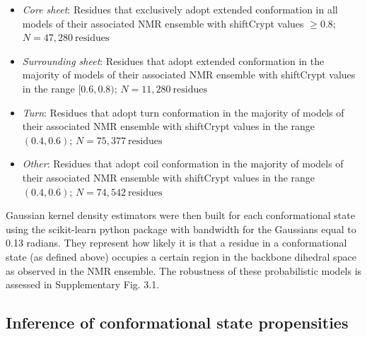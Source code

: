 \begin{itemize}
  \item \textit{Core sheet}: Residues that exclusively adopt extended conformation in all models of their associated NMR ensemble with shiftCrypt values $\ge 0.8$; $N = 47,280 \:\text{residues}$
  \item \textit{Surrounding sheet}: Residues that adopt extended conformation in the majority of models of their associated NMR ensemble with shiftCrypt values in the range $[0.6, 0.8)$; $N = 11,280 \:\text{residues}$
  \item \textit{Turn}: Residues that adopt turn conformation in the majority of models of their associated NMR ensemble with shiftCrypt values in the range $(0.4, 0.6)$; $N = 75,377 \:\text{residues}$
  \item \textit{Other}: Residues that  adopt coil conformation in the majority of models of their associated NMR ensemble with shiftCrypt values in the range $(0.4, 0.6)$; $N = 74,542 \:\text{residues}$
\end{itemize}

Gaussian kernel density estimators were then built for each conformational state using the scikit-learn python package with bandwidth for the Gaussians equal to 0.13 radians. They represent how likely it is that a residue in a conformational state (as defined above) occupies a certain region in the backbone dihedral space as observed in the NMR ensemble. The robustness of these probabilistic models is assessed in Supplementary Fig. 3.1. %

\subsection{Inference of conformational state propensities} \label{inference_conf_states}

